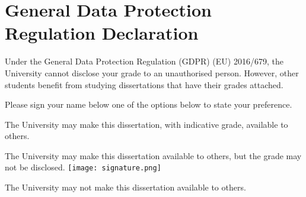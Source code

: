 \section*{General Data Protection Regulation Declaration}
\vspace{0.5cm}
\begin{flushleft}
Under the General Data Protection Regulation (GDPR) (EU) 2016/679, the University cannot disclose your grade to an unauthorised person. However, other students benefit from studying dissertations that have their grades attached.\newline
\vspace{0.5cm}

Please sign your name below one of the options below to state your preference.\newline
\vspace{0.5cm}

The University may make this dissertation, with indicative grade, available to others.\newline
\vspace{3cm}

The University may make this dissertation available to others, but the grade may not be disclosed.\newline
\texttt{[image: signature.png]}
\vspace{2.5cm}

The University may not make this dissertation available to others.\newline
\end{flushleft}
